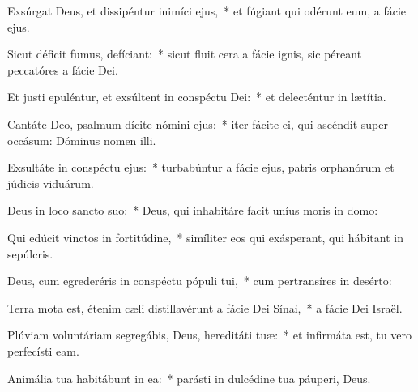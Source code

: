 \item Exsúrgat Deus, et dissipéntur inimíci ejus,~* et fúgiant qui odérunt eum, a fácie ejus.

\item Sicut déficit fumus, defíciant:~* sicut fluit cera a fácie ignis, sic péreant peccatóres a fácie Dei.

\item Et justi epuléntur, et exsúltent in conspéctu Dei:~* et delecténtur in lætítia.

\item Cantáte Deo, psalmum dícite nómini ejus:~* iter fácite ei, qui ascéndit super occásum: Dóminus nomen illi.

\item Exsultáte in conspéctu ejus:~* turbabúntur a fácie ejus, patris orphanórum et júdicis viduárum.

\item Deus in loco sancto suo:~* Deus, qui inhabitáre facit uníus moris in domo:

\item Qui edúcit vinctos in fortitúdine,~* simíliter eos qui exásperant, qui hábitant in sepúlcris.

\item Deus, cum egrederéris in conspéctu pópuli tui,~* cum pertransíres in desérto:

\item Terra mota est, étenim cæli distillavérunt a fácie Dei Sínai,~* a fácie Dei Israël.

\item Plúviam voluntáriam segregábis, Deus, hereditáti tuæ:~* et infirmáta est, tu vero perfecísti eam.

\item Animália tua habitábunt in ea:~* parásti in dulcédine tua páuperi, Deus.
